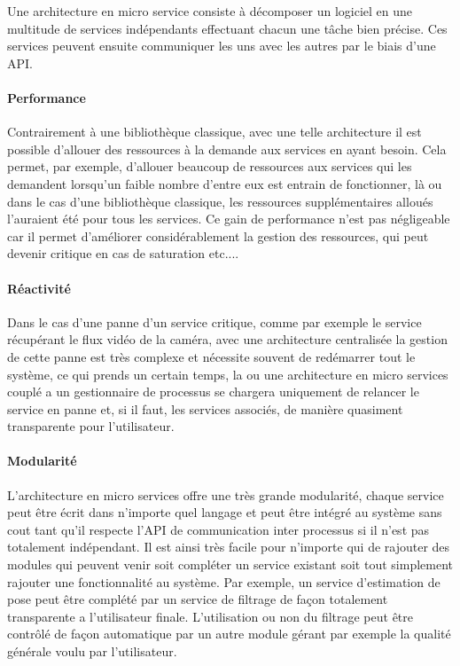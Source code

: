Une architecture en micro service consiste à décomposer un logiciel en une multitude de services indépendants effectuant chacun une tâche bien précise. Ces services peuvent ensuite communiquer les uns avec les autres par le biais d'une API.

\paragraph{Performance} Contrairement à une bibliothèque classique, avec une telle architecture il est possible d'allouer des ressources à la demande aux services en ayant besoin. Cela permet, par exemple, d'allouer beaucoup de ressources aux services qui les demandent lorsqu'un faible nombre d'entre eux est entrain de fonctionner, là ou dans le cas d'une bibliothèque classique, les ressources supplémentaires alloués l'auraient été pour tous les services. Ce gain de performance n'est pas négligeable car il permet d'améliorer considérablement la gestion des ressources, qui peut devenir critique en cas de saturation etc....

\paragraph{Réactivité} Dans le cas d'une panne d'un service critique, comme par exemple le service récupérant le flux vidéo de la caméra, avec une architecture centralisée la gestion de cette panne est très complexe et nécessite souvent de redémarrer tout le système, ce qui prends un certain temps, la ou une architecture en micro services couplé a un gestionnaire de processus se chargera uniquement de relancer le service en panne et, si il faut, les services associés, de manière quasiment transparente pour l'utilisateur.

\paragraph{Modularité} L'architecture en micro services offre une très grande modularité, chaque service peut être écrit dans n'importe quel langage et peut être intégré au système sans cout tant qu'il respecte l'API de communication inter processus si il n'est pas totalement indépendant. Il est ainsi très facile pour n'importe qui de rajouter des modules qui peuvent venir soit compléter un service existant soit tout simplement rajouter une fonctionnalité au système. Par exemple, un service d'estimation de pose peut être complété par un service de filtrage de façon totalement transparente a l'utilisateur finale. L'utilisation ou non du filtrage peut être contrôlé de façon automatique par un autre module gérant par exemple la qualité générale voulu par l'utilisateur.

